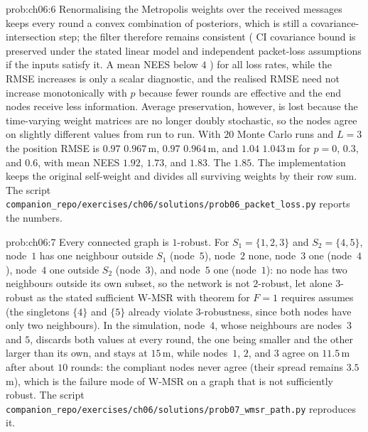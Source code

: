 \documentclass[graybox,envcountchap]{style/SNmono}
\newcommand{\repopath}[1]{\texttt{#1}}
\providecommand{\DIFadd}[1]{{\protect\color{blue} #1}} %
\providecommand{\DIFdel}[1]{{\protect\color{red} #1}} %
\providecommand{\DIFaddbegin}{} %
\providecommand{\DIFaddend}{} %
\providecommand{\DIFdelbegin}{} %
\providecommand{\DIFdelend}{} %
\begin{document}
\begin{sol}{prob:ch06:6}
Renormalising the Metropolis weights over the received messages keeps every round a convex combination of posteriors, which is still a covariance-intersection step; the \DIFdelbegin \DIFdel{filter therefore remains consistent (}\DIFdelend \DIFaddbegin \DIFadd{CI covariance bound is preserved under the stated linear model and independent packet-loss assumptions if the inputs satisfy it. A }\DIFaddend mean NEES below $4$ \DIFdelbegin \DIFdel{) for all loss rates, while the RMSE increases }\DIFdelend \DIFaddbegin \DIFadd{is only a scalar diagnostic, and the realised RMSE need not increase monotonically }\DIFaddend with $p$ because fewer rounds are effective and the end nodes receive less information. Average preservation, however, is lost because the time-varying weight matrices are no longer doubly stochastic, so the nodes agree on slightly different values from run to run. With $20$ Monte Carlo runs and $L=3$ the position RMSE is \DIFdelbegin \DIFdel{$0.97$}\DIFdelend \DIFaddbegin \DIFadd{$0.967$}\DIFaddend \,m, \DIFdelbegin \DIFdel{$0.97$}\DIFdelend \DIFaddbegin \DIFadd{$0.964$}\DIFaddend \,m, and \DIFdelbegin \DIFdel{$1.04$}\DIFdelend \DIFaddbegin \DIFadd{$1.043$}\DIFaddend \,m for $p=0$, $0.3$, and $0.6$, with mean NEES $1.92$, $1.73$, and \DIFdelbegin \DIFdel{$1.83$. The }\DIFdelend \DIFaddbegin \DIFadd{$1.85$. The implementation keeps the original self-weight and divides all surviving weights by their row sum. The }\DIFaddend script \repopath{companion\_\allowbreak repo/\allowbreak exercises/\allowbreak ch06/\allowbreak solutions/\allowbreak prob06\_\allowbreak packet\_\allowbreak loss.py} reports the numbers.
\end{sol}

\begin{sol}{prob:ch06:7}
Every connected graph is $1$-robust. For $S_1=\{1,2,3\}$ and $S_2=\{4,5\}$, node~$1$ has one neighbour outside $S_1$ (node~$5$), node~$2$ none, node~$3$ one (node~$4$), node~$4$ one outside $S_2$ (node~$3$), and node~$5$ one (node~$1$): no node has two neighbours outside its own subset, so the network is not $2$-robust, let alone $3$-robust as \DIFaddbegin \DIFadd{the stated sufficient }\DIFaddend W-MSR \DIFdelbegin \DIFdel{with }\DIFdelend \DIFaddbegin \DIFadd{theorem for }\DIFaddend $F=1$ \DIFdelbegin \DIFdel{requires }\DIFdelend \DIFaddbegin \DIFadd{assumes }\DIFaddend (the singletons $\{4\}$ and $\{5\}$ already violate $3$-robustness, since both nodes have only two neighbours). In the simulation, node~$4$, whose neighbours are nodes~$3$ and $5$, discards both values at every round, the one being smaller and the other larger than its own, and stays at $15$\,m, while nodes~$1$, $2$, and $3$ agree on $11.5$\,m after about $10$ rounds: the compliant nodes never agree (their spread remains $3.5$\,m), which is the failure mode of W-MSR on a graph that is not sufficiently robust. The script \repopath{companion\_\allowbreak repo/\allowbreak exercises/\allowbreak ch06/\allowbreak solutions/\allowbreak prob07\_\allowbreak wmsr\_\allowbreak path.py} reproduces it.
\end{sol}
\end{document}
